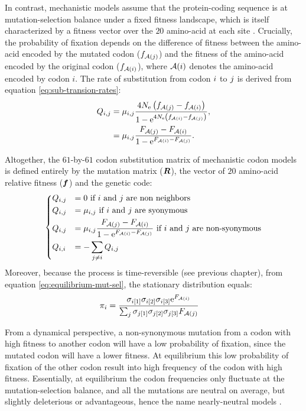 In contrast, mechanistic models assume that the protein-coding sequence is at mutation-selection balance under a fixed fitness landscape, which is itself characterized by a fitness vector over the $20$ amino-acid at each site \citep{Yang2008, Halpern1998, Rodrigue2010}.
Crucially, the probability of fixation depends on the difference of fitness between the amino-acid encoded by the mutated \gls{codon} ($f_{\mathcal{A}({j})}$) and the fitness of the amino-acid encoded by the original \gls{codon} ($f_{\mathcal{A}({i})}$), where $\mathcal{A}({i})$ denotes the amino-acid encoded by \gls{codon} $i$.
The rate of \gls{substitution} from \gls{codon} ${i}$ to ${j}$ is derived from equation \ref{eq:sub-transion-rates}:
\begin{align}
Q_{{i}, {j}} & = \mu_{{i}, {j}} \dfrac{4 N_{\textrm{e}} \left({f_{\mathcal{A}({j})} - f_{\mathcal{A}({i})}}\right)}{{1 - \mathrm{e}^{4 N_{\textrm{e}} \left({f_{\mathcal{A}({i})} - f_{\mathcal{A}({j})}}\right)} }}, \\
& = \mu_{{i}, {j}} \dfrac{F_{\mathcal{A}({j})} - F_{\mathcal{A}({i})}}{1 - \mathrm{e}^{F_{\mathcal{A}({i})} - F_{\mathcal{A}({j})}} }.
\end{align}

Altogether, the $61$-by-$61$ \gls{codon} \gls{substitution} matrix of mechanistic \gls{codon} models is defined entirely by the mutation matrix ($\bm{R}$), the vector of $20$ amino-acid relative fitness ($\bm{f}$) and the genetic code:
\begin{equation}
\begin{dcases}
Q_{{i}, {j}} & = 0 \text{ if ${i}$ and ${j}$ are non neighbors} \\
Q_{{i}, {j}} & = \mu_{{i}, {j}} \text{ if ${i}$ and ${j}$ are syonymous} \\
Q_{{i}, {j}} & = \mu_{{i}, {j}} \dfrac{F_{\mathcal{A}({j})} - F_{\mathcal{A}({i})}}{1 - \mathrm{e}^{F_{\mathcal{A}({i})} - F_{\mathcal{A}({j})}} } \text{ if ${i}$ and ${j}$ are non-syonymous} \\
Q_{{i}, {i}} & = - \sum_{{j} \neq {i}} Q_{{i}, {j}}
\end{dcases}
\label{eq:propensities-models}
\end{equation}
Moreover, because the process is time-reversible (see previous chapter), from equation \ref{eq:equilibrium-mut-sel}, the stationary distribution equals:
\begin{align}
\pi_{{i}} & = \dfrac{\sigma_{{i}[1]}\sigma_{{i}[2]}\sigma_{{i}[3]}\mathrm{e}^{F_{\mathcal{A}({i})}}}{\sum_{{j}}\sigma_{{j}[1]}\sigma_{{j}[2]}\sigma_{{j}[3]}F_{\mathcal{A}({j})} }
\end{align}

From a dynamical perspective, a non-synonymous mutation from a \gls{codon} with high fitness to another \gls{codon} will have a low probability of fixation, since the mutated \gls{codon} will have a lower fitness.
At equilibrium this low probability of fixation of the other \gls{codon} result into high frequency of the \gls{codon} with high fitness.
Essentially, at equilibrium the \gls{codon} frequencies only fluctuate at the mutation-selection balance, and all the mutations are \gls{neutral} on average, but slightly deleterious or advantageous, hence the name \gls{nearly-neutral} models \citep{Ohta1973, Ohta1992, Rodrigue2016}.

